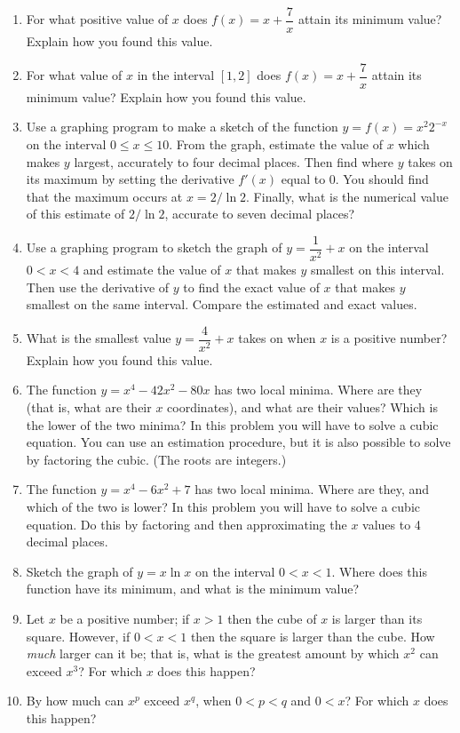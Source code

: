 \begin{enumerate}
\item For what positive value of $x$ does $f(x) = x + \dfrac{7}{x}$
attain its minimum value?  Explain how you found this value.


\item For what value of $x$ in the interval $[1,2]$ does $f(x) = x +
\dfrac{7}{x}$ attain its minimum value?  Explain how you found this
value.


\item Use a graphing program to make a sketch of the function $y = f(x)
= x^{2} 2^{-x}$ on the interval $0 \leq x \leq 10$.  From the graph,
estimate the value of $x$ which makes $y$ largest, accurately to four
decimal places.  Then find where $y$ takes on its maximum by setting
the derivative $f'(x)$ equal to 0.  You should find that the maximum
occurs at $x = 2/\ln{2}$.  Finally, what is the numerical value of
this estimate of $2/\ln{2}$, accurate to seven decimal places?


\item Use a graphing program to sketch the graph of $y = \dfrac{1}{x^2}
+ x$ on the interval $0 < x < 4$ and estimate the value of $x$ that
makes $y$ smallest on this interval.  Then use the derivative of $y$
to find the exact value of $x$ that makes $y$ smallest on the same
interval.  Compare the estimated and exact values.


\item What is the smallest value $y = \dfrac{4}{x^2} + x$ takes on when
$x$ is a positive number?  Explain how you found this value.


\item The function $y = x^4 - 42 x^2 -80x$ has two local minima.  Where
are they (that is, what are their $x$ coordinates), and what are their
values?  Which is the lower of the two minima?  In this problem you
will have to solve a cubic equation.  You can use an estimation
procedure, but it is also possible to solve by factoring the cubic.
(The roots are integers.)


\item The function $y = x^4 - 6x^2 + 7$ has two local minima.  Where
are they, and which of the two is lower?  In this problem you will
have to solve a cubic equation.  Do this by factoring and then
approximating the $x$ values to 4 decimal places.


\item Sketch the graph of $y = x \ln{x}$ on the interval $0 < x < 1$.
Where does this function have its minimum, and what is the minimum
value?


\item Let $x$ be a positive number; if $x > 1$ then the cube of $x$ is
larger than its square.  However, if $0 < x < 1$ then the square is
larger than the cube.  How {\em much\/} larger can it be; that is,
what is the greatest amount by which $x^2$ can exceed $x^3$? For which
$x$ does this happen?


\item By how much can $x^p$ exceed $x^q$, when $0 < p < q$ and $0 < x$?
For which $x$ does this happen?



\end{enumerate}
